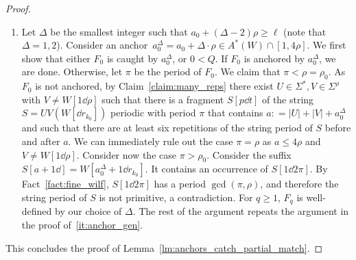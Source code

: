 \begin{proof}
\begin{enumerate}[label=\textrm{(\alph*)}]
\begin{figure}[ht!]
\captionsetup[subfigure]{labelformat=empty}
\begin{subfigure}{\textwidth}
\centering
{}
  \caption{Subcase $t-4\pi+1 \leq |U|+|V|+a_{q-1}^\Delta$.} 
  \label{fig:lemma_2_case_t_leq}
\end{subfigure}
\begin{subfigure}{\textwidth}
\centering
{}
  \caption{Subcase $t-4\pi+1 \geq |U|+|V|+a_{q-1}^\Delta$.}
  \label{fig:lemma_2_case_t_geq}
\end{subfigure}
\caption{Illustration of the proof of Lemma~\ref{lm:anchors_catch_partial_match}\ref{it:anchor_gen}, case $\pi > \rho_q$.}
\end{figure}

\item Let $\Delta$ be the smallest integer such that $a_0+(\Delta-2) \rho \ge \ell$ (note that $\Delta = 1,2$). Consider an anchor~$a_0^\Delta = a_0+\Delta \cdot \rho \in A^\ast(W) \cap [1, 4\rho]$. We first show that either $F_0$ is caught by $a_0^\Delta$, or $0 < Q$. If $F_0$ is anchored by $a_0^\Delta$, we are done. Otherwise, let $\pi$ be the period of $F_0$. We claim that $\pi < \rho = \rho_0$. As~$F_0$ is not anchored, by Claim~\ref{claim:many_reps} there exist $U \in \Sigma^\ast, V \in \Sigma^\rho$ with $V \neq W[1 \dd \rho]$ such that there is a fragment $S[p \dd t]$ of the string $S = UV(W[\dd r_{k_0}])$ periodic with period $\pi$ that contains $a: = |U|+|V|+a_0^\Delta$ and such that there are at least six repetitions of the string period of $S$ before and after $a$. We can immediately rule out the case $\pi = \rho$ as $a \leq 4\rho$ and $V \neq W[1 \dd \rho]$. Consider now the case $\pi > \rho_0$. Consider the suffix~$S[a+1\dd] = W[a_0^\Delta+1 \dd r_{k_0}]$. It contains an occurrence of $S[1\dd 2 \pi]$. By Fact~\ref{fact:fine_wilf}, $S[1\dd 2 \pi]$ has a period $\gcd(\pi, \rho)$, and therefore the string period of $S$ is not primitive, a contradiction. For $q \ge 1$, $F_q$ is well-defined by our choice of $\Delta$. 
The rest of the argument repeats the argument in the proof of~\ref{it:anchor_gen}.
\end{enumerate}
This concludes the proof of Lemma~\ref{lm:anchors_catch_partial_match}.
\end{proof}
